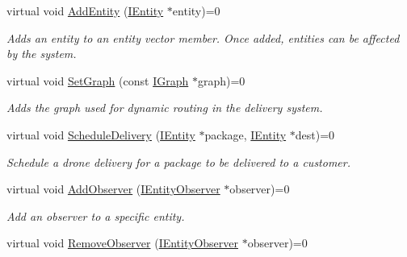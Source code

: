 \begin{DoxyCompactItemize}
virtual void \hyperlink{classcsci3081_1_1IDeliverySystem_ae8fe57f0627f3429d4a8cea4d910e233}{Add\+Entity} (\hyperlink{classentity__project_1_1IEntity}{I\+Entity} $\ast$entity)=0
\begin{DoxyCompactList}\small\item\em Adds an entity to an entity vector member. Once added, entities can be affected by the system. \end{DoxyCompactList}\item 
\mbox{\label{classcsci3081_1_1IDeliverySystem_ac379454e54cc392ff7c24f565a3e8353}} 
virtual void \hyperlink{classcsci3081_1_1IDeliverySystem_ac379454e54cc392ff7c24f565a3e8353}{Set\+Graph} (const \hyperlink{classentity__project_1_1IGraph}{I\+Graph} $\ast$graph)=0
\begin{DoxyCompactList}\small\item\em Adds the graph used for dynamic routing in the delivery system. \end{DoxyCompactList}\item 
virtual void \hyperlink{classcsci3081_1_1IDeliverySystem_a25210b242623675309c16e8a2c3cfd0e}{Schedule\+Delivery} (\hyperlink{classentity__project_1_1IEntity}{I\+Entity} $\ast$package, \hyperlink{classentity__project_1_1IEntity}{I\+Entity} $\ast$dest)=0
\begin{DoxyCompactList}\small\item\em Schedule a drone delivery for a package to be delivered to a customer. \end{DoxyCompactList}\item 
\mbox{\label{classcsci3081_1_1IDeliverySystem_a53161d8f9f94ee5f56e39f98b52ac3e2}} 
virtual void \hyperlink{classcsci3081_1_1IDeliverySystem_a53161d8f9f94ee5f56e39f98b52ac3e2}{Add\+Observer} (\hyperlink{classentity__project_1_1IEntityObserver}{I\+Entity\+Observer} $\ast$observer)=0
\begin{DoxyCompactList}\small\item\em Add an observer to a specific entity. \end{DoxyCompactList}\item 
\mbox{\label{classcsci3081_1_1IDeliverySystem_a79d4336f9fd4bcb837a5be1713f84ab1}} 
virtual void \hyperlink{classcsci3081_1_1IDeliverySystem_a79d4336f9fd4bcb837a5be1713f84ab1}{Remove\+Observer} (\hyperlink{classentity__project_1_1IEntityObserver}{I\+Entity\+Observer} $\ast$observer)=0

\end{DoxyCompactItemize}
